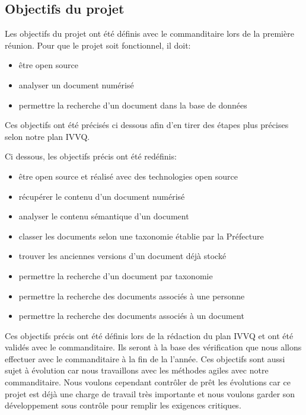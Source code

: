 

\subsection{Objectifs du projet}

Les objectifs du projet ont été définis avec le commanditaire lors de la première réunion.
Pour que le projet soit fonctionnel, il doit:
\begin{itemize}
\item être open source
\item analyser un document numérisé
\item permettre la recherche d'un document dans la base de données

\end{itemize}

Ces objectifs ont été précisés ci dessous afin d'en tirer des étapes plus précises selon notre plan IVVQ\@.  

Ci dessous, les objectifs précis ont été redéfinis:
\begin{itemize}
\item être open source et réalisé avec des technologies open source
\item récupérer le contenu d'un document numérisé
\item analyser le contenu sémantique d’un document
\item classer les documents selon une taxonomie établie par la Préfecture
\item trouver les anciennes versions d’un document déjà stocké
\item permettre la recherche d’un document par taxonomie
\item permettre la recherche des documents associés à une personne
\item permettre la recherche des documents associés à un document
\end{itemize}


Ces objectifs précis ont été définis lors de la rédaction du plan IVVQ et ont été validés avec le commanditaire.
Ils seront à la base des vérification que nous allons effectuer avec le commanditaire à la fin de la l'année.
Ces objectifs sont aussi sujet à évolution car nous travaillons avec les méthodes agiles avec notre commanditaire.
Nous voulons cependant contrôler de prêt les évolutions car ce projet est déjà une charge de travail très importante et nous voulons garder son développement sous contrôle pour remplir les exigences critiques.



